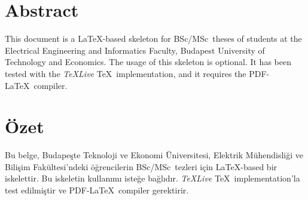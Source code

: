 \selectenglish

\chapter*{Abstract}

This document is a \LaTeX-based skeleton for BSc/MSc~theses of students at the Electrical Engineering and Informatics Faculty, Budapest University of Technology and Economics. The usage of this skeleton is optional. It has been tested with the \emph{TeXLive} \TeX~implementation, and it requires the PDF-\LaTeX~compiler.

\vfill
\selecthungarian


\chapter*{{\"O}zet}

Bu belge, Budapeşte Teknoloji ve Ekonomi Üniversitesi, Elektrik Mühendisliği ve Bilişim Fakültesi'ndeki öğrencilerin BSc/MSc~tezleri için \LaTeX-based bir iskelettir. Bu iskeletin kullanımı isteğe bağlıdır. \emph{TeXLive} \TeX~implementation'la test edilmiştir ve PDF-\LaTeX~compiler gerektirir.


\selectenglish


\vfill
\selectthesislanguage
